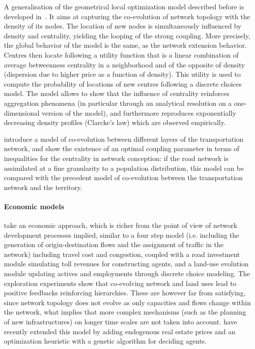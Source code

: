 \documentclass[10pt]{article}
\begin{document}
A generalisation of the geometrical local optimization model described before is developed in~\cite{barthelemy2009co}. It aims at capturing the co-evolution of network topology with the density of its nodes. The location of new nodes is simultaneously influenced by density and centrality, yielding the looping of the strong coupling. More precisely, the global behavior of the model is the same, as the network extension behavior. Centres then locate following a utility function that is a linear combination of average betweenness centrality in a neighborhood and of the opposite of density (dispersion due to higher price as a function of density). This utility is used to compute the probability of locations of new centres following a discrete choices model. The model allows to show that the influence of centrality reinforces aggregation phenomena (in particular through an analytical resolution on a one-dimensional version of the model), and furthermore reproduces exponentially decreasing density profiles (Clarcke's law) which are observed empirically. 

\cite{ding2017heuristic} introduce a model of co-evolution between different layers of the transportation network, and show the existence of an optimal coupling parameter in terms of inequalities for the centrality in network conception: if the road network is assimilated at a fine granularity to a population distribution, this model can be compared with the precedent model of co-evolution between the transportation network and the territory.

\paragraph{Economic models}

\cite{levinson2007co} take an economic approach, which is richer from the point of view of network development processes implied, similar to a four step model (i.e. including the generation of origin-destination flows and the assignment of traffic in the network) including travel cost and congestion, coupled with a road investment module simulating toll revenues for constructing agents, and a land-use evolution module updating actives and employments through discrete choice modeling. The exploration experiments show that co-evolving network and land uses lead to positive feedbacks reinforcing hierarchies. These are however far from satisfying, since network topology does not evolve as only capacities and flows change within the network, what implies that more complex mechanisms (such as the planning of new infrastructures) on longer time scales are not taken into account. \cite{li2016integrated} have recently extended this model by adding endogenous real estate prices and an optimization heuristic with a genetic algorithm for deciding agents.
\end{document}
